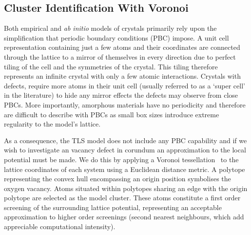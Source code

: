 \subsection{Cluster Identification With Voronoi}\label{sec:voronoi}

Both empirical and \textit{ab initio} models of crystals primarily rely upon the simplification that periodic boundary conditions (PBC) impose.
A unit cell representation containing just a few atoms and their coordinates are connected through the lattice to a mirror of themselves in every direction due to perfect tiling of the cell and the symmetries of the crystal.
This tiling therefore represents an infinite crystal with only a few atomic interactions.
Crystals with defects, require more atoms in their unit cell (usually referred to as a `super cell' in the literature) to hide any mirror effects the defects may observe from close PBCs.
More importantly, amorphous materials have no periodicity and therefore are difficult to describe with PBCs as small box sizes introduce extreme regularity to the model's lattice.

As a consequence, the TLS model does not include any PBC capability and if we wish to investigate an vacancy defect in corundum an approximation to the local potential must be made.
We do this by applying a Voronoi tessellation~\cite{Voronoi1908} to the lattice coordinates of each system using a Euclidean distance metric.
A polytope representing the convex hull encompassing an origin position symbolises the oxygen vacancy.
Atoms situated within polytopes sharing an edge with the origin polytope are selected as the model cluster.
These atoms constitute a first order screening of the surrounding lattice potential, representing an acceptable approximation to higher order screenings (\eg second nearest neighbours, which add appreciable computational intensity).


